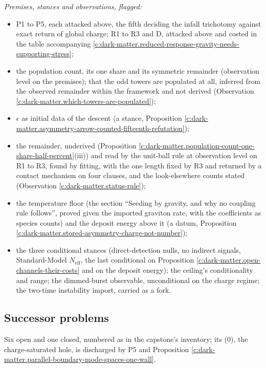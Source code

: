 \documentclass[11pt]{article}
\theoremstyle{definition}
\theoremstyle{plain}
\providecommand{\Neff}{}\renewcommand{\Neff}{N_{\mathrm{eff}}}
\begin{document}
\emph{Premises, stances and observations, flagged:}
\begin{itemize} 
\item P1 to P5, each attacked above, the fifth deciding the infall trichotomy against exact return of global charge; R1 to R3 and D, attacked above and costed in the table accompanying \ref{c:dark-matter.reduced-response-gravity-needs-supporting-stress};
\item the population count, its one share and its symmetric remainder (observation level on the premises); that the odd towers are populated at all, inferred from the observed remainder within the framework and not derived (Observation \ref{c:dark-matter.which-towers-are-populated});
\item $\epsilon$ as initial data of the descent (a stance, Proposition \ref{c:dark-matter.asymmetry-arrow-counted-fifteenth-refutation});
\item the remainder, underived (Proposition \ref{c:dark-matter.population-count-one-share-half-percent}(iii)) and read by the unit-ball rule at observation level on R1 to R3, found by fitting, with the one length fixed by R3 and returned by a contact mechanism on four clauses, and the look-elsewhere counts stated (Observation \ref{c:dark-matter.status-rule});
\item the temperature floor (the section ``Seeding by gravity, and why no coupling rule follows'', proved given the imported graviton rate, with the coefficients as species counts) and the deposit energy above it (a datum, Proposition \ref{c:dark-matter.stored-asymmetry-charge-not-number});
\item the three conditional stances (direct-detection nulls, no indirect signals, Standard-Model $\Neff$, the last conditional on Proposition \ref{c:dark-matter.open-channels-their-costs} and on the deposit energy); the ceiling's conditionality and range; the dimmed-burst observable, unconditional on the charge regime; the two-time instability import, carried as a fork.
\end{itemize}

\subsection*{Successor problems}
\label{c:note.dark-matter.setting-successor-problems}
Six open and one closed, numbered as in the capstone's inventory; its (0), the charge-saturated hole, is discharged by P5 and Proposition \ref{c:dark-matter.parallel-boundary-mode-spaces-one-wall}.
\end{document}
